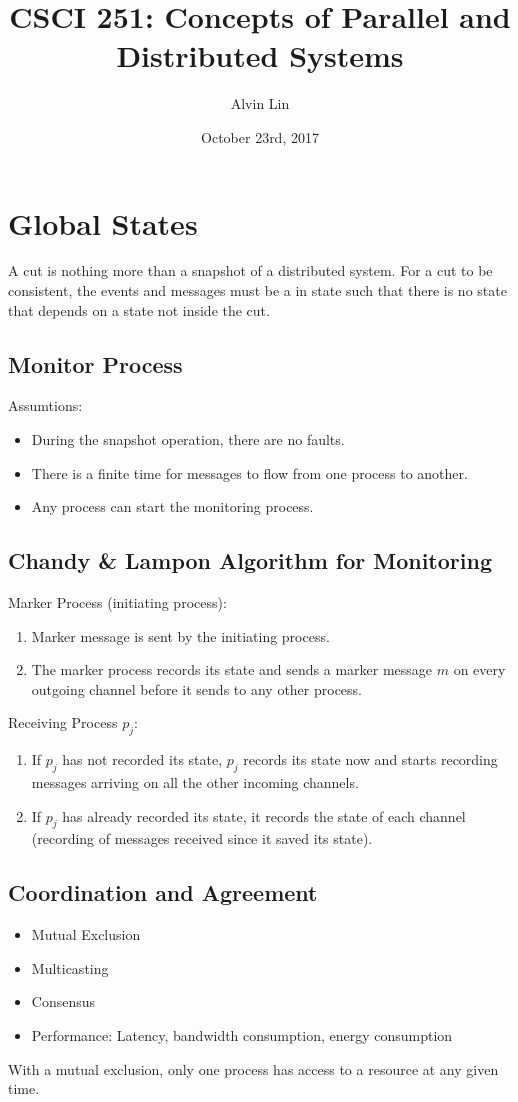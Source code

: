 \documentclass{math}
\title{CSCI 251: Concepts of Parallel and Distributed Systems}
\author{Alvin Lin}
\date{October 23rd, 2017}
\begin{document}
\maketitle

\section*{Global States}
A cut is nothing more than a snapshot of a distributed system. For a cut to be
consistent, the events and messages must be a in state such that there is no
state that depends on a state not inside the cut.

\subsection*{Monitor Process}
Assumtions:
\begin{itemize}
  \item During the snapshot operation, there are no faults.
  \item There is a finite time for messages to flow from one process to another.
  \item Any process can start the monitoring process.
\end{itemize}

\subsection*{Chandy \& Lampon Algorithm for Monitoring}
Marker Process (initiating process):
\begin{enumerate}
  \item Marker message is sent by the initiating process.
  \item The marker process records its state and sends a marker message
  \( m \) on every outgoing channel before it sends to any other process.
\end{enumerate}
Receiving Process \( p_j \):
\begin{enumerate}
  \item If \( p_j \) has not recorded its state, \( p_j \) records its state
  now and starts recording messages arriving on all the other incoming
  channels.
  \item If \( p_j \) has already recorded its state, it records the state of
  each channel (recording of messages received since it saved its state).
\end{enumerate}

\subsection*{Coordination and Agreement}
\begin{itemize}
  \item Mutual Exclusion
  \item Multicasting
  \item Consensus
  \item Performance: Latency, bandwidth consumption, energy consumption
\end{itemize}
With a mutual exclusion, only one process has access to a resource at any given
time.
\end{document}
